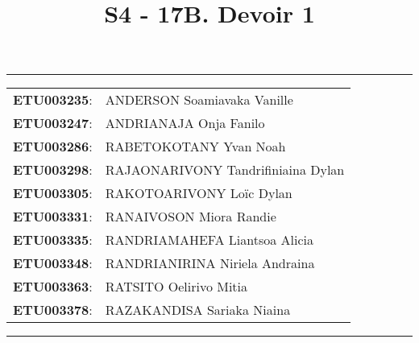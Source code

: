 \documentclass[a4paper,12pt]{article}
\begin{document}
	
\title{\textbf{S4 - 17B. Devoir 1}}
\date{}
\maketitle

\hrule
\vspace{1em}

\begin{tabular}{rl}
	\textbf{ETU003235}: & ANDERSON Soamiavaka Vanille \\
	\textbf{ETU003247}: & ANDRIANAJA Onja Fanilo \\
	\textbf{ETU003286}: & RABETOKOTANY Yvan Noah \\
	\textbf{ETU003298}: & RAJAONARIVONY Tandrifiniaina Dylan \\
	\textbf{ETU003305}: & RAKOTOARIVONY Loïc Dylan \\
	\textbf{ETU003331}: & RANAIVOSON Miora Randie \\
	\textbf{ETU003335}: & RANDRIAMAHEFA Liantsoa Alicia \\
	\textbf{ETU003348}: & RANDRIANIRINA Niriela Andraina \\
	\textbf{ETU003363}: & RATSITO Oelirivo Mitia \\
	\textbf{ETU003378}: & RAZAKANDISA Sariaka Niaina \\
\end{tabular}

\vspace{1em}
\hrule

\newpage
\end{document}
